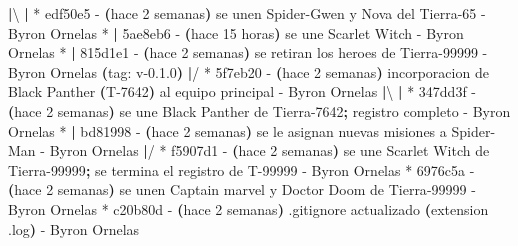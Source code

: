 \documentclass[
]{book}
\newenvironment{Shaded}{\begin{snugshade}}{\end{snugshade}}
\newcommand{\AttributeTok}[1]{\textcolor[rgb]{0.13,0.29,0.53}{#1}}
\newcommand{\ErrorTok}[1]{\textcolor[rgb]{0.64,0.00,0.00}{\textbf{#1}}}
\newcommand{\ExtensionTok}[1]{#1}
\newcommand{\KeywordTok}[1]{\textcolor[rgb]{0.13,0.29,0.53}{\textbf{#1}}}
\newcommand{\NormalTok}[1]{#1}
\begin{document}
\begin{Shaded}
\begin{Highlighting}[]
\KeywordTok{|}\ExtensionTok{\textbackslash{} } 
\KeywordTok{|} \ExtensionTok{*}\NormalTok{ edf50e5 }\AttributeTok{{-}} \ErrorTok{(}\ExtensionTok{hace}\NormalTok{ 2 semanas}\KeywordTok{)} \ExtensionTok{se}\NormalTok{ unen Spider{-}Gwen y Nova del Tierra{-}65 }\AttributeTok{{-}}\NormalTok{ Byron Ornelas}
\ExtensionTok{*} \KeywordTok{|} \ExtensionTok{5ae8eb6} \AttributeTok{{-}} \ErrorTok{(}\ExtensionTok{hace}\NormalTok{ 15 horas}\KeywordTok{)} \ExtensionTok{se}\NormalTok{ une Scarlet Witch }\AttributeTok{{-}}\NormalTok{ Byron Ornelas}
\ExtensionTok{*} \KeywordTok{|} \ExtensionTok{815d1e1} \AttributeTok{{-}} \ErrorTok{(}\ExtensionTok{hace}\NormalTok{ 2 semanas}\KeywordTok{)} \ExtensionTok{se}\NormalTok{ retiran los heroes de Tierra{-}99999 }\AttributeTok{{-}}\NormalTok{ Byron Ornelas }\ErrorTok{(}\ExtensionTok{tag:}\NormalTok{ v{-}0.1.0}\KeywordTok{)}
\KeywordTok{|}\ExtensionTok{/}  
\ExtensionTok{*}\NormalTok{   5f7eb20 }\AttributeTok{{-}} \ErrorTok{(}\ExtensionTok{hace}\NormalTok{ 2 semanas}\KeywordTok{)} \ExtensionTok{incorporacion}\NormalTok{ de Black Panther }\ErrorTok{(}\ExtensionTok{T{-}7642}\KeywordTok{)} \ExtensionTok{al}\NormalTok{ equipo principal }\AttributeTok{{-}}\NormalTok{ Byron Ornelas}
\KeywordTok{|}\ExtensionTok{\textbackslash{} } 
\KeywordTok{|} \ExtensionTok{*}\NormalTok{ 347dd3f }\AttributeTok{{-}} \ErrorTok{(}\ExtensionTok{hace}\NormalTok{ 2 semanas}\KeywordTok{)} \ExtensionTok{se}\NormalTok{ une Black Panther de Tierra{-}7642}\KeywordTok{;} \ExtensionTok{registro}\NormalTok{ completo }\AttributeTok{{-}}\NormalTok{ Byron Ornelas}
\ExtensionTok{*} \KeywordTok{|} \ExtensionTok{bd81998} \AttributeTok{{-}} \ErrorTok{(}\ExtensionTok{hace}\NormalTok{ 2 semanas}\KeywordTok{)} \ExtensionTok{se}\NormalTok{ le asignan nuevas misiones a Spider{-}Man }\AttributeTok{{-}}\NormalTok{ Byron Ornelas}
\KeywordTok{|}\ExtensionTok{/}  
\ExtensionTok{*}\NormalTok{ f5907d1 }\AttributeTok{{-}} \ErrorTok{(}\ExtensionTok{hace}\NormalTok{ 2 semanas}\KeywordTok{)} \ExtensionTok{se}\NormalTok{ une Scarlet Witch de Tierra{-}99999}\KeywordTok{;} \ExtensionTok{se}\NormalTok{ termina el registro de T{-}99999 }\AttributeTok{{-}}\NormalTok{ Byron Ornelas}
\ExtensionTok{*}\NormalTok{ 6976c5a }\AttributeTok{{-}} \ErrorTok{(}\ExtensionTok{hace}\NormalTok{ 2 semanas}\KeywordTok{)} \ExtensionTok{se}\NormalTok{ unen Captain marvel y Doctor Doom de Tierra{-}99999 }\AttributeTok{{-}}\NormalTok{ Byron Ornelas}
\ExtensionTok{*}\NormalTok{ c20b80d }\AttributeTok{{-}} \ErrorTok{(}\ExtensionTok{hace}\NormalTok{ 2 semanas}\KeywordTok{)} \ExtensionTok{.gitignore}\NormalTok{ actualizado }\ErrorTok{(}\ExtensionTok{extension}\NormalTok{ .log}\KeywordTok{)} \ExtensionTok{{-}}\NormalTok{ Byron Ornelas}

\end{Highlighting}
\end{Shaded}
\end{document}
